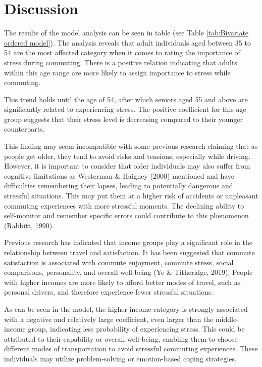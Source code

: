 \documentclass[
11pt, %
oneside, %
english, %
singlespacing, %
]{macthesis} %
\begin{document}
\hypertarget{discussion}{%
\section{Discussion}\label{discussion}}

The results of the model analysis can be seen in table (see Table \ref{tab:Bivariate ordered model}). The analysis reveals that adult individuals aged between 35 to 54 are the most affected category when it comes to rating the importance of stress during commuting. There is a positive relation indicating that adults within this age range are more likely to assign importance to stress while commuting.

This trend holds until the age of 54, after which seniors aged 55 and above are significantly related to experiencing stress. The positive coefficient for this age group suggests that their stress level is decreasing compared to their younger counterparts.

This finding may seem incompatible with some previous research claiming that as people get older, they tend to avoid risks and tensions, especially while driving. However, it is important to consider that older individuals may also suffer from cognitive limitations as Westerman \& Haigney (2000) mentioned and have difficulties remembering their lapses, leading to potentially dangerous and stressful situations. This may put them at a higher risk of accidents or unpleasant commuting experiences with more stressful moments. The declining ability to self-monitor and remember specific errors could contribute to this phenomenon (Rabbitt, 1990).

Previous research has indicated that income groups play a significant role in the relationship between travel and satisfaction. It has been suggested that commute satisfaction is associated with commute enjoyment, commute stress, social comparisons, personality, and overall well-being (Ye \& Titheridge, 2019). People with higher incomes are more likely to afford better modes of travel, such as personal drivers, and therefore experience fewer stressful situations.

As can be seen in the model, the higher income category is strongly associated with a negative and relatively large coefficient, even larger than the middle-income group, indicating less probability of experiencing stress. This could be attributed to their capability or overall well-being, enabling them to choose different modes of transportation to avoid stressful commuting experiences. These individuals may utilize problem-solving or emotion-based coping strategies.
\end{document}
